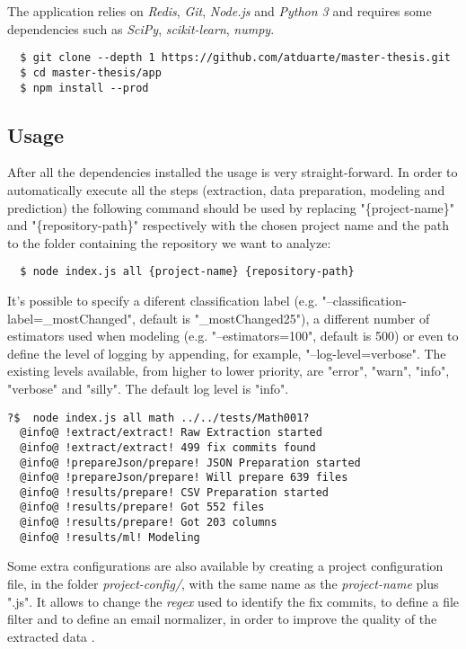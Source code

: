 The application relies on \emph{Redis}, \emph{Git}, \emph{Node.js} and \emph{Python 3} and requires some dependencies such as \emph{SciPy}, \emph{scikit-learn}, \emph{numpy}.

\begin{lstlisting}
  $ git clone --depth 1 https://github.com/atduarte/master-thesis.git
  $ cd master-thesis/app
  $ npm install --prod
\end{lstlisting}

\subsection{Usage}

After all the dependencies installed the usage is very straight-forward.
In order to automatically execute all the steps (extraction, data preparation, modeling and prediction) the following command should be used
by replacing "\{project-name\}" and "\{repository-path\}" respectively with
the chosen project name and the path to the folder containing the repository we want to analyze:

\begin{lstlisting}
  $ node index.js all {project-name} {repository-path}
\end{lstlisting}

It's possible to specify a diferent classification label (e.g. "--classification-label=\_mostChanged", default is "\_mostChanged25"), 
a different number of estimators used when modeling (e.g. "--estimators=100", default is 500) or even
to define the level of logging by appending, for example, "--log-level=verbose". The existing levels available, from higher to lower priority, are
"error", "warn", "info", "verbose" and "silly". The default log level is "info".

\begin{lstlisting}[style=npmlog]
  ?$  node index.js all math ../../tests/Math001?
  @info@ !extract/extract! Raw Extraction started
  @info@ !extract/extract! 499 fix commits found
  @info@ !prepareJson/prepare! JSON Preparation started
  @info@ !prepareJson/prepare! Will prepare 639 files
  @info@ !results/prepare! CSV Preparation started
  @info@ !results/prepare! Got 552 files
  @info@ !results/prepare! Got 203 columns
  @info@ !results/ml! Modeling
\end{lstlisting}

Some extra configurations are also available by creating a project configuration file, in the folder \emph{project-config/}, with the same name as the \emph{project-name} plus ".js".
It allows to change the \emph{regex} used to identify the fix commits, to define a file filter and to define an email normalizer, in order to improve the quality of the extracted data .


